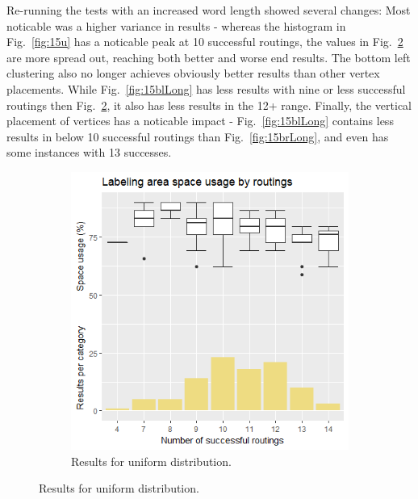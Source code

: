 \documentclass[11pt,a4paper]{vutinfth}
\begin{document}
Re-running the tests with an increased word length showed several changes: Most noticable was a higher variance in results - whereas the histogram in Fig.~\ref*{fig:15u} has a noticable peak at 10 successful routings, the values in Fig.~\ref*{fig:15uLong} are more spread out, reaching both better and worse end results.
The bottom left clustering also no longer achieves obviously better results than other vertex placements. While Fig.~\ref*{fig:15blLong} has less results with nine or less successful routings then Fig.~\ref*{fig:15uLong}, it also has less results in the 12+ range.
Finally, the vertical placement of vertices has a noticable impact - Fig.~\ref*{fig:15blLong} contains less results in below 10 successful routings than Fig.~\ref*{fig:15brLong}, and even has some instances with 13 successes.

\begin{figure}
	\centering
	\begin{subfigure}[b]{/11}
		\centering
		\includegraphics[scale=0.55]{Rplot_15u_longer.png}
		\caption{\label{fig:15uLong}Results for uniform distribution.}
	\end{subfigure}


\end{figure}
\end{document}
